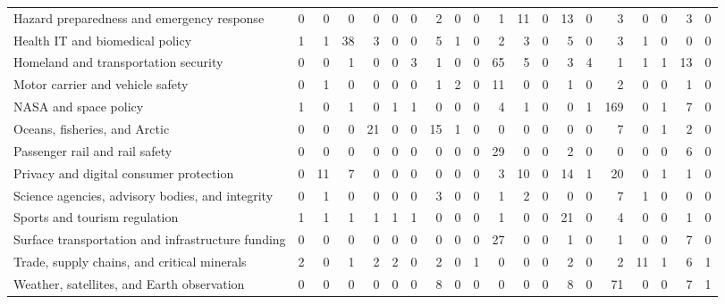 \begin{tabular}{lrrrrrrrrrrrrrrrrrrr}
Hazard preparedness and emergency response & 0 & 0 & 0 & 0 & 0 & 0 & 2 & 0 & 0 & 1 & 11 & 0 & 13 & 0 & 3 & 0 & 0 & 3 & 0 \\
Health IT and biomedical policy & 1 & 1 & 38 & 3 & 0 & 0 & 5 & 1 & 0 & 2 & 3 & 0 & 5 & 0 & 3 & 1 & 0 & 0 & 0 \\
Homeland and transportation security & 0 & 0 & 1 & 0 & 0 & 3 & 1 & 0 & 0 & 65 & 5 & 0 & 3 & 4 & 1 & 1 & 1 & 13 & 0 \\
Motor carrier and vehicle safety & 0 & 1 & 0 & 0 & 0 & 0 & 1 & 2 & 0 & 11 & 0 & 0 & 1 & 0 & 2 & 0 & 0 & 1 & 0 \\
NASA and space policy & 1 & 0 & 1 & 0 & 1 & 1 & 0 & 0 & 0 & 4 & 1 & 0 & 0 & 1 & 169 & 0 & 1 & 7 & 0 \\
Oceans, fisheries, and Arctic & 0 & 0 & 0 & 21 & 0 & 0 & 15 & 1 & 0 & 0 & 0 & 0 & 0 & 0 & 7 & 0 & 1 & 2 & 0 \\
Passenger rail and rail safety & 0 & 0 & 0 & 0 & 0 & 0 & 0 & 0 & 0 & 29 & 0 & 0 & 2 & 0 & 0 & 0 & 0 & 6 & 0 \\
Privacy and digital consumer protection & 0 & 11 & 7 & 0 & 0 & 0 & 0 & 0 & 0 & 3 & 10 & 0 & 14 & 1 & 20 & 0 & 1 & 1 & 0 \\
Science agencies, advisory bodies, and integrity & 0 & 1 & 0 & 0 & 0 & 0 & 3 & 0 & 0 & 1 & 2 & 0 & 0 & 0 & 7 & 1 & 0 & 0 & 0 \\
Sports and tourism regulation & 1 & 1 & 1 & 1 & 1 & 1 & 0 & 0 & 0 & 1 & 0 & 0 & 21 & 0 & 4 & 0 & 0 & 1 & 0 \\
Surface transportation and infrastructure funding & 0 & 0 & 0 & 0 & 0 & 0 & 0 & 0 & 0 & 27 & 0 & 0 & 1 & 0 & 1 & 0 & 0 & 7 & 0 \\
Trade, supply chains, and critical minerals & 2 & 0 & 1 & 2 & 2 & 0 & 2 & 0 & 1 & 0 & 0 & 0 & 2 & 0 & 2 & 11 & 1 & 6 & 1 \\
Weather, satellites, and Earth observation & 0 & 0 & 0 & 0 & 0 & 0 & 8 & 0 & 0 & 0 & 0 & 0 & 8 & 0 & 71 & 0 & 0 & 7 & 1 \\
\bottomrule
\end{tabular}
